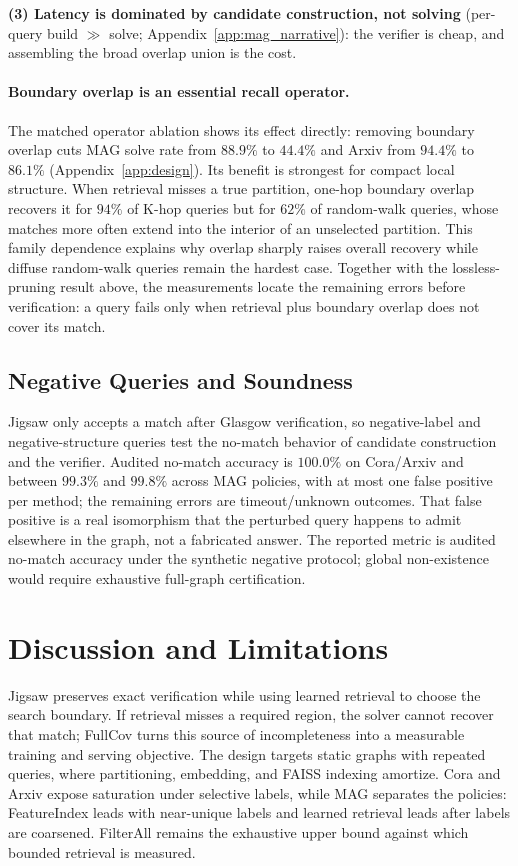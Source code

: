 \documentclass{article}
\begin{document}
\textbf{(3) Latency is dominated by candidate construction, not solving} (per-query build $\gg$ solve; Appendix~\ref{app:mag_narrative}): the verifier is cheap, and assembling the broad overlap union is the cost.

\paragraph{Boundary overlap is an essential recall operator.}
The matched operator ablation shows its effect directly: removing boundary overlap cuts MAG solve rate from $88.9\%$ to $44.4\%$ and Arxiv from $94.4\%$ to $86.1\%$ (Appendix~\ref{app:design}). Its benefit is strongest for compact local structure. When retrieval misses a true partition, one-hop boundary overlap recovers it for $94\%$ of K-hop queries but for $62\%$ of random-walk queries, whose matches more often extend into the interior of an unselected partition. This family dependence explains why overlap sharply raises overall recovery while diffuse random-walk queries remain the hardest case. Together with the lossless-pruning result above, the measurements locate the remaining errors before verification: a query fails only when retrieval plus boundary overlap does not cover its match.

\subsection{Negative Queries and Soundness}

Jigsaw only accepts a match after Glasgow verification, so negative-label and negative-structure queries test the no-match behavior of candidate construction and the verifier. Audited no-match accuracy is $100.0\%$ on Cora/Arxiv and between $99.3\%$ and $99.8\%$ across MAG policies, with at most one false positive per method; the remaining errors are timeout/unknown outcomes. That false positive is a real isomorphism that the perturbed query happens to admit elsewhere in the graph, not a fabricated answer. The reported metric is audited no-match accuracy under the synthetic negative protocol; global non-existence would require exhaustive full-graph certification.

\section{Discussion and Limitations}
\label{sec:limits}

Jigsaw preserves exact verification while using learned retrieval to choose the search boundary. If retrieval misses a required region, the solver cannot recover that match; FullCov turns this source of incompleteness into a measurable training and serving objective. The design targets static graphs with repeated queries, where partitioning, embedding, and FAISS indexing amortize. Cora and Arxiv expose saturation under selective labels, while MAG separates the policies: FeatureIndex leads with near-unique labels and learned retrieval leads after labels are coarsened. FilterAll remains the exhaustive upper bound against which bounded retrieval is measured.
\end{document}
